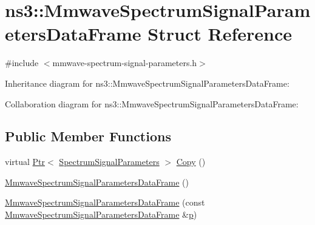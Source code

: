 \hypertarget{structns3_1_1MmwaveSpectrumSignalParametersDataFrame}{}\section{ns3\+:\+:Mmwave\+Spectrum\+Signal\+Parameters\+Data\+Frame Struct Reference}
\label{structns3_1_1MmwaveSpectrumSignalParametersDataFrame}


{\ttfamily \#include $<$mmwave-\/spectrum-\/signal-\/parameters.\+h$>$}



Inheritance diagram for ns3\+:\+:Mmwave\+Spectrum\+Signal\+Parameters\+Data\+Frame\+:


Collaboration diagram for ns3\+:\+:Mmwave\+Spectrum\+Signal\+Parameters\+Data\+Frame\+:
\subsection*{Public Member Functions}
\begin{DoxyCompactItemize}
\item 
virtual \hyperlink{classns3_1_1Ptr}{Ptr}$<$ \hyperlink{structns3_1_1SpectrumSignalParameters}{Spectrum\+Signal\+Parameters} $>$ \hyperlink{structns3_1_1MmwaveSpectrumSignalParametersDataFrame_ac4328786c124c54f0cdfc85da110bead}{Copy} ()
\item 
\hyperlink{structns3_1_1MmwaveSpectrumSignalParametersDataFrame_a360c970067cd1384d87cbaa7ac5ff474}{Mmwave\+Spectrum\+Signal\+Parameters\+Data\+Frame} ()
\item 
\hyperlink{structns3_1_1MmwaveSpectrumSignalParametersDataFrame_ab1339b17952831fb2d887b25a1e29f17}{Mmwave\+Spectrum\+Signal\+Parameters\+Data\+Frame} (const \hyperlink{structns3_1_1MmwaveSpectrumSignalParametersDataFrame}{Mmwave\+Spectrum\+Signal\+Parameters\+Data\+Frame} \&\hyperlink{lte__link__budget__x2__handover__measures_8m_ac9de518908a968428863f829398a4e62}{p})
\end{DoxyCompactItemize}
